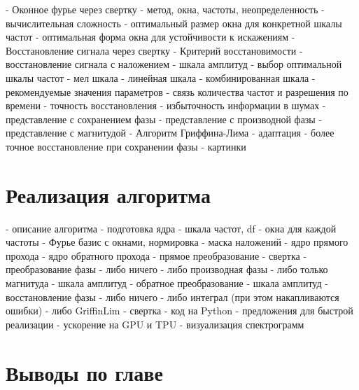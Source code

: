 \begin{markdown}
 - Оконное фурье через свертку
   - метод, окна, частоты, неопределенность
   - вычислительная сложность
 - оптимальный размер окна для конкретной шкалы частот
 - оптимальная форма окна для устойчивости к искажениям
 - Восстановление сигнала через свертку
 - Критерий восстановимости
 - восстановление сигнала с наложением
 - шкала амплитуд
 - выбор оптимальной шкалы частот
   - мел шкала
   - линейная шкала
   - комбинированная шкала
 - рекомендуемые значения параметров
 - связь количества частот и разрешения по времени
 - точность восстановления
 - избыточность информации в шумах
 - представление с сохранением фазы
 - представление с производной фазы
 - представление с магнитудой
 - Алгоритм Гриффина-Лима
  - адаптация
  - более точное восстановление при сохранении фазы
 - картинки
\end{markdown}

\section{Реализация алгоритма}
\begin{markdown}
 - описание алгоритма
   - подготовка ядра
     - шкала частот, df
	 - окна для каждой частоты
	 - Фурье базис с окнами, нормировка
	 - маска наложений
	 - ядро прямого прохода
	 - ядро обратного прохода
   - прямое преобразование
     - свертка
	 - преобразование фазы
	   - либо ничего
	   - либо производная фазы
	   - либо только магнитуда
	 - шкала амплитуд
   - обратное преобразование
     - шкала амплитуд
	 - восстановление фазы
	   - либо ничего
	   - либо интеграл (при этом накапливаются ошибки)
	   - либо GriffinLim
	 - свертка
 - код на Python
 - предложения для быстрой реализации
 - ускорение на GPU и TPU
 - визуализация спектрограмм
\end{markdown}

\section{Выводы по главе}
